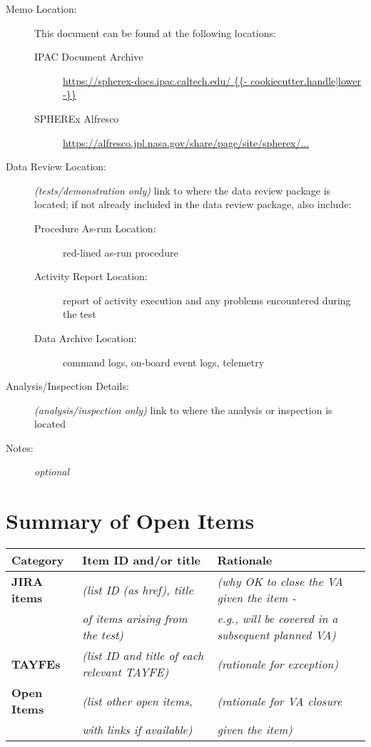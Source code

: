 \documentclass[TR]{spherex}
\begin{document}
\begin{description}
  \item[Memo Location:] This document can be found at the following locations:
    \begin{description}
      \item[IPAC Document Archive] \url{https://spherex-docs.ipac.caltech.edu/ {{- cookiecutter.handle|lower -}} }
      \item[SPHEREx Alfresco] \url{https://alfresco.jpl.nasa.gov/share/page/site/spherex/...}
    \end{description}
  \item[Data Review Location:] \textit{(tests/demonstration only)} link to where the data review package is located; if not already included in the data review package, also include:
    \begin{description}
      \item[Procedure As-run Location:] red-lined as-run procedure
      \item[Activity Report Location:] report of activity execution and any problems encountered during the test
      \item[Data Archive Location:] command logs, on-board event logs, telemetry
    \end{description}
  \item[Analysis/Inspection Details:] \textit{(analysis/inspection only)} link to where the analysis or inspection is located
  \item[Notes:] \textit{optional}
\end{description}


\section{Summary of Open Items}

\begin{longtable}{|l|l|l|}
\hline
\textbf{Category} & \textbf{Item ID and/or title} & \textbf{Rationale} \\ \hline\hline
\endhead
\textbf{JIRA items} & \textit{(list ID (as href), title} & \textit{(why OK to close the VA given the item -} \\
 & \textit{of items arising from the test)} & \textit{e.g., will be covered in a subsequent planned VA)} \\
\hline
\textbf{TAYFEs} & \textit{(list ID and title of each relevant TAYFE)} & \textit{(rationale for exception)} \\
\hline
\textbf{Open Items} & \textit{(list other open items,} & \textit{(rationale for VA closure} \\
 & \textit{with links if available)} & \textit{given the item)} \\
\hline
\end{longtable}
\end{document}
